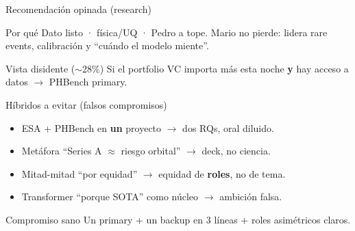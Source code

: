 \documentclass[aspectratio=169,10pt]{beamer}
\begin{document}
\begin{frame}{Recomendación opinada (research)}
  \vspace{0.25em}
  \begin{block}{Por qué}
    Dato listo · física/UQ · Pedro a tope. Mario no pierde: lidera rare events, calibración y ``cuándo el modelo miente''.
  \end{block}
  \begin{block}{Vista disidente ($\sim$28\%)}
    Si el portfolio VC importa más esta noche \textbf{y} hay acceso a datos $\rightarrow$ PHBench primary.
  \end{block}
\end{frame}

\begin{frame}{Híbridos a evitar (falsos compromisos)}
  \begin{itemize}
    \item ESA + PHBench en \textbf{un} proyecto $\rightarrow$ dos RQs, oral diluido.
    \item Metáfora ``Series A $\approx$ riesgo orbital'' $\rightarrow$ deck, no ciencia.
    \item Mitad-mitad ``por equidad'' $\rightarrow$ equidad de \textbf{roles}, no de tema.
    \item Transformer ``porque SOTA'' como núcleo $\rightarrow$ ambición falsa.
  \end{itemize}
  \vspace{0.35em}
  \begin{block}{Compromiso sano}
    Un primary + un backup en 3 líneas + roles asimétricos claros.
  \end{block}
\end{frame}
\end{document}
